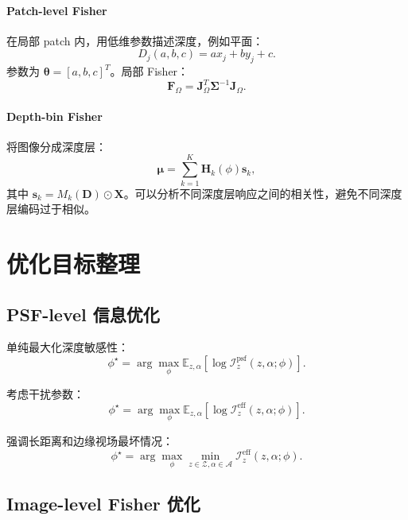 \documentclass[11pt,a4paper,fontset=none]{ctexart}
\begin{document}
\paragraph{Patch-level Fisher}
在局部 patch 内，用低维参数描述深度，例如平面：
\begin{equation}
  D_j(a,b,c)=a x_j+b y_j+c.
\end{equation}
参数为 $\bm\theta=[a,b,c]^T$。局部 Fisher：
\begin{equation}
  \bm F_\Omega=
  \bm J_\Omega^T\bm\Sigma^{-1}\bm J_\Omega.
\end{equation}

\paragraph{Depth-bin Fisher}
将图像分成深度层：
\begin{equation}
  \bm\mu=
  \sum_{k=1}^{K}
  \bm H_k(\phi)\bm s_k,
\end{equation}
其中 $\bm s_k=M_k(\bm D)\odot\bm X$。可以分析不同深度层响应之间的相关性，避免不同深度层编码过于相似。

\section{优化目标整理}

\subsection{PSF-level 信息优化}

单纯最大化深度敏感性：
\begin{equation}
  \phi^\star
  =
  \arg\max_\phi
  \mathbb E_{z,\alpha}
  \left[
  \log
  \mathcal I_z^{\mathrm{psf}}(z,\alpha;\phi)
  \right].
\end{equation}

考虑干扰参数：
\begin{equation}
\boxed{
  \phi^\star
  =
  \arg\max_\phi
  \mathbb E_{z,\alpha}
  \left[
  \log
  \mathcal I_z^{\mathrm{eff}}(z,\alpha;\phi)
  \right].
}
\end{equation}

强调长距离和边缘视场最坏情况：
\begin{equation}
\boxed{
  \phi^\star
  =
  \arg\max_\phi
  \min_{z\in\mathcal Z,\alpha\in\mathcal A}
  \mathcal I_z^{\mathrm{eff}}(z,\alpha;\phi).
}
\end{equation}

\subsection{Image-level Fisher 优化}
\end{document}
